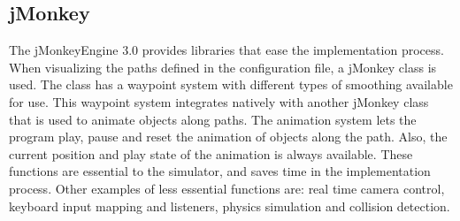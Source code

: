 \subsection{jMonkey}

The jMonkeyEngine 3.0 provides libraries that ease the implementation process. When visualizing the paths defined in the configuration file, a jMonkey class is used. The class has a waypoint system with different types of smoothing available for use. This waypoint system integrates natively with another jMonkey class that is used to animate objects along paths. The animation system lets the program play, pause and reset the animation of objects along the path. Also, the current position and play state of the animation is always available. These functions are essential to the simulator, and saves time in the implementation process. Other examples of less essential functions are: real time camera control, keyboard input mapping and listeners, physics simulation and collision detection.